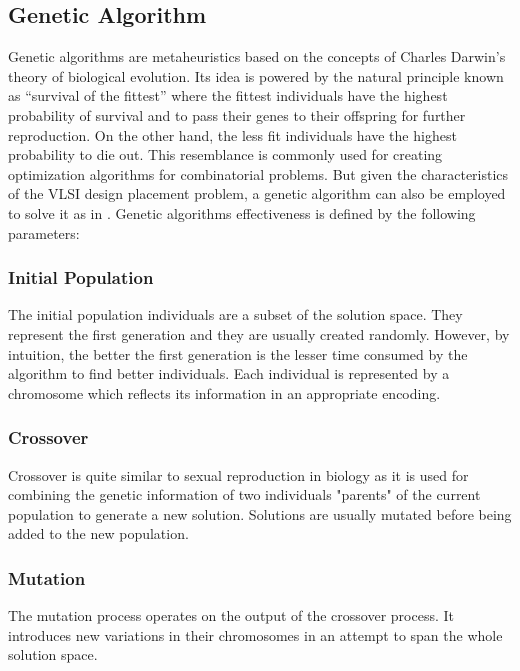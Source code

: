 \documentclass[conference]{IEEEtran}
\begin{document}
\subsection{Genetic Algorithm}

Genetic algorithms are metaheuristics based on the concepts of Charles Darwin's theory of biological evolution. Its idea is powered by the natural principle known as “survival of the fittest” where the fittest individuals have the highest probability of survival and to pass their genes to their offspring for further reproduction. On the other hand, the less fit individuals have the highest probability to die out. This resemblance is commonly used for creating optimization algorithms for combinatorial problems. But given the characteristics of the VLSI design placement problem, a genetic algorithm can also be employed to solve it as in \cite{b2}. Genetic algorithms effectiveness is defined by the following parameters:

\subsubsection{Initial Population}

The initial population individuals are a subset of the solution space. They represent the first generation and they are usually created randomly. However, by intuition, the better the first generation is the lesser time consumed by the algorithm to find better individuals. Each individual is represented by a chromosome which reflects its information in an appropriate encoding.

\medskip

\subsubsection{Crossover}

Crossover is quite similar to sexual reproduction in biology as it is used for combining the genetic information of two individuals "parents" of the current population to generate a new solution. Solutions are usually mutated before being added to the new population.

\medskip

\subsubsection{Mutation}

The mutation process operates on the output of the crossover process. It introduces new variations in their chromosomes in an attempt to span the whole solution space.
\end{document}
